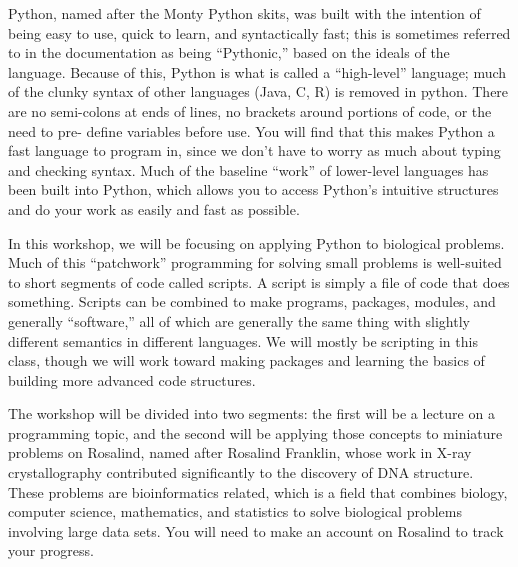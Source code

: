 \documentclass[a4paper,11pt]{article}
\begin{document}
Python, named after the Monty Python skits, was built with the intention of being easy to use,
quick to learn, and syntactically fast; this is sometimes referred to in the documentation as being
“Pythonic,” based on the ideals of the language. Because of this, Python is what is called a “high-level” 
language; much of the clunky syntax of other languages (Java, C, R) is removed in python.
There are no semi-colons at ends of lines, no brackets around portions of code, or the need to pre-
define variables before use. You will find that this makes Python a fast language to program in, since
we don't have to worry as much about typing and checking syntax. Much of the baseline “work” of
lower-level languages has been built into Python, which allows you to access Python's intuitive
structures and do your work as easily and fast as possible. \par

In this workshop, we will be focusing on applying Python to biological problems. Much of this
“patchwork” programming for solving small problems is well-suited to short segments of code called
scripts. A script is simply a file of code that does something. Scripts can be combined to make
programs, packages, modules, and generally “software,” all of which are generally the same thing with
slightly different semantics in different languages. We will mostly be scripting in this class, though we
will work toward making packages and learning the basics of building more advanced code structures. \par

The workshop will be divided into two segments: the first will be a lecture on a programming
topic, and the second will be applying those concepts to miniature problems on Rosalind, named after
Rosalind Franklin, whose work in X-ray crystallography contributed significantly to the discovery of
DNA structure. These problems are bioinformatics related, which is a field that combines biology,
computer science, mathematics, and statistics to solve biological problems involving large data sets.
You will need to make an account on Rosalind to track your progress.

\pagebreak
\end{document}
